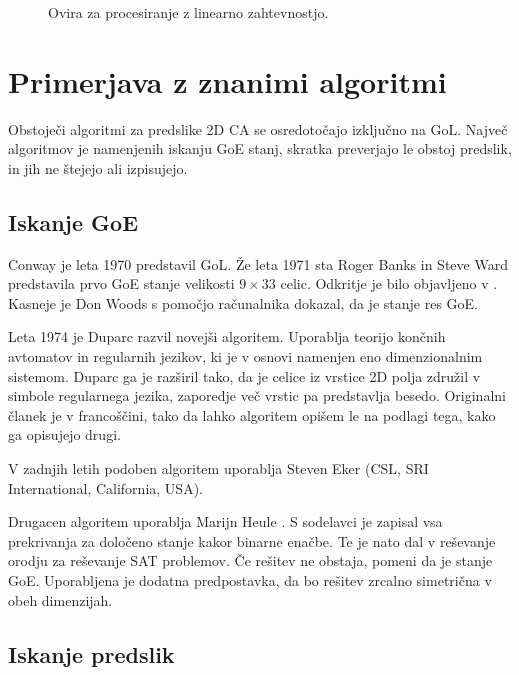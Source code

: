 \documentclass[12pt,a4paper,openany,twoside]{book}
\begin{document}
\begin{figure}[htb]
\centerline{}
\caption[Ovira za procesiranje z linearno zahtevnostjo.]{Ovira za procesiranje z linearno zahtevnostjo.}
\label{algorithm_issue}
\end{figure}

\chapter{Primerjava z znanimi algoritmi}

Obstoječi algoritmi za predslike 2D CA se osredotočajo izključno na GoL.
Največ algoritmov je namenjenih iskanju GoE stanj, skratka preverjajo le
obstoj predslik, in jih ne štejejo ali izpisujejo.

\section{Iskanje GoE}

Conway je leta 1970 predstavil GoL. Že leta 1971 sta Roger Banks in Steve Ward
predstavila prvo GoE stanje velikosti \(9 \times 33\) celic.
Odkritje je bilo objavljeno v \cite{Lifeline3}. Kasneje je Don Woods
\cite{Lifeline3, Lifeline4} s pomočjo računalnika dokazal, da je stanje res GoE.

Leta 1974 je Duparc \cite{Duparc1972, Duparc1974} razvil novejši algoritem.
Uporablja teorijo končnih avtomatov in regularnih jezikov, ki je v
osnovi namenjen eno dimenzionalnim sistemom. Duparc ga je razširil
tako, da je celice iz vrstice 2D polja združil v simbole regularnega jezika,
zaporedje več vrstic pa predstavlja besedo. Originalni članek je v francoščini,
tako da lahko algoritem opišem le na podlagi tega, kako ga opisujejo drugi.

V zadnjih letih podoben algoritem uporablja Steven Eker
(CSL, SRI International, California, USA).



Drugacen algoritem uporablja Marijn Heule \cite{Hartman2013}.
S sodelavci je zapisal vsa prekrivanja za določeno stanje kakor binarne enačbe.
Te je nato dal v reševanje orodju za reševanje SAT problemov.
Če rešitev ne obstaja, pomeni da je stanje GoE.
Uporabljena je dodatna predpostavka, da bo rešitev
zrcalno simetrična v obeh dimenzijah.

\section{Iskanje predslik}
\end{document}
